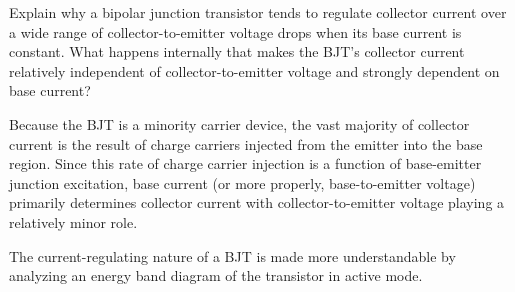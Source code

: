 

Explain why a bipolar junction transistor tends to regulate collector current over a wide range of collector-to-emitter voltage drops when its base current is constant.  What happens internally that makes the BJT's collector current relatively independent of collector-to-emitter voltage and strongly dependent on base current?







Because the BJT is a minority carrier device, the vast majority of collector current is the result of charge carriers injected from the emitter into the base region.  Since this rate of charge carrier injection is a function of base-emitter junction excitation, base current (or more properly, base-to-emitter voltage) primarily determines collector current with collector-to-emitter voltage playing a relatively minor role.







The current-regulating nature of a BJT is made more understandable by analyzing an energy band diagram of the transistor in active mode.




